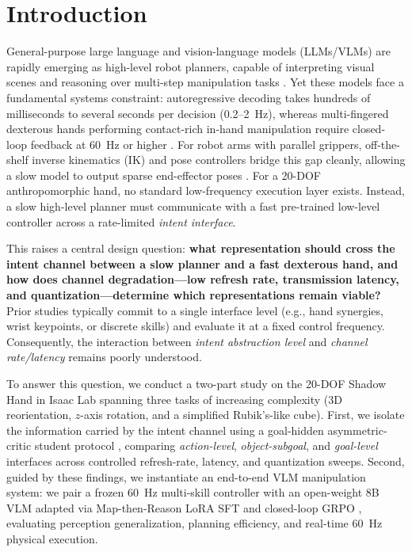 \section{Introduction}
\label{sec:intro}

General-purpose large language and vision-language models (LLMs/VLMs) are rapidly emerging as high-level robot planners, capable of interpreting visual scenes and reasoning over multi-step manipulation tasks \citep{mirchandani2023llms,tang2026training}.
Yet these models face a fundamental systems constraint: autoregressive decoding takes hundreds of milliseconds to several seconds per decision (0.2--2~Hz), whereas multi-fingered dexterous hands performing contact-rich in-hand manipulation require closed-loop feedback at 60~Hz or higher \citep{andrychowicz2020learning,akkaya2019solving}.
For robot arms with parallel grippers, off-the-shelf inverse kinematics (IK) and pose controllers bridge this gap cleanly, allowing a slow model to output sparse end-effector poses \citep{tang2026training}.
For a 20-DOF anthropomorphic hand, no standard low-frequency execution layer exists.
Instead, a slow high-level planner must communicate with a fast pre-trained low-level controller across a rate-limited \emph{intent interface}.

This raises a central design question: \textbf{what representation should cross the intent channel between a slow planner and a fast dexterous hand, and how does channel degradation—low refresh rate, transmission latency, and quantization—determine which representations remain viable?}
Prior studies typically commit to a single interface level (e.g., hand synergies, wrist keypoints, or discrete skills) and evaluate it at a fixed control frequency.
Consequently, the interaction between \emph{intent abstraction level} and \emph{channel rate/latency} remains poorly understood.

To answer this question, we conduct a two-part study on the 20-DOF Shadow Hand in Isaac Lab \citep{mittal2023orbit} spanning three tasks of increasing complexity (3D reorientation, $z$-axis rotation, and a simplified Rubik's-like cube).
First, we isolate the information carried by the intent channel using a goal-hidden asymmetric-critic student protocol \citep{pinto2018asymmetric}, comparing \emph{action-level}, \emph{object-subgoal}, and \emph{goal-level} interfaces across controlled refresh-rate, latency, and quantization sweeps.
Second, guided by these findings, we instantiate an end-to-end VLM manipulation system: we pair a frozen 60~Hz multi-skill controller with an open-weight 8B VLM adapted via Map-then-Reason LoRA SFT and closed-loop GRPO \citep{shao2024deepseekmath}, evaluating perception generalization, planning efficiency, and real-time 60~Hz physical execution.

